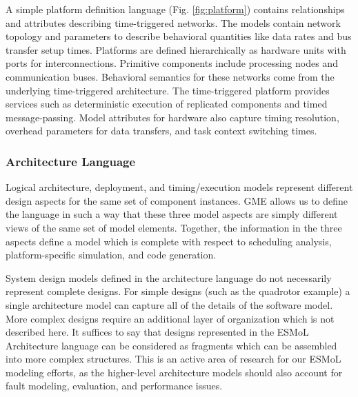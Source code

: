 A simple platform definition language (Fig. \ref{fig:platform}) 
contains relationships and attributes describing time-triggered 
networks.  The models contain network topology and parameters to describe 
behavioral quantities like data rates and bus transfer setup times.
Platforms are defined 
hierarchically as hardware units with ports for 
interconnections. Primitive components include 
processing nodes and communication buses.  Behavioral 
semantics for these networks come from the underlying 
time-triggered architecture.  The time-triggered 
platform provides services such as deterministic 
execution of replicated components and timed 
message-passing.  Model attributes for hardware also 
capture timing resolution, overhead parameters for 
data transfers, and task context switching times.

\subsubsection*{Architecture Language}

Logical architecture, deployment, and timing/execution
models represent different design aspects for the same set 
of component instances.  GME allows us to define the 
language in such a way that these three model aspects are 
simply different views of the same set of model elements.
Together, the information in the three aspects define a model
which is complete with respect to scheduling analysis,
platform-specific simulation, and code generation.

System design models defined in the architecture language do not 
necessarily represent complete designs.  For simple designs (such as 
the quadrotor example) a single architecture model can capture all of 
the details of the software model.  More complex designs require an
additional layer of organization which is not described here.  It
suffices to say that designs represented in the ESMoL Architecture 
language can be considered as fragments which can be assembled into
more complex structures.  This is an active area of research for
our ESMoL modeling efforts, as the higher-level architecture models
should also account for fault modeling, evaluation, and performance issues.

